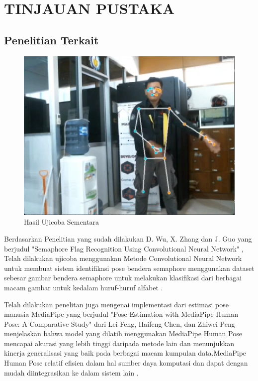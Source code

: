 \section{TINJAUAN PUSTAKA}


\subsection{Penelitian Terkait}
\begin{figure} [ht] \centering
    \includegraphics[scale=0.5]{gambar/contoh.png}
    \caption{Hasil Ujicoba Sementara}
    \label{fig:Ujicoba Sementara}
  \end{figure}

Berdasarkan Penelitian yang sudah dilakukan D. Wu, X. Zhang dan J. Guo yang berjudul "Semaphore Flag Recognition Using Convolutional Neural Network" , Telah dilakukan ujicoba menggunakan Metode Convolutional Neural Network untuk membuat sistem identifikasi pose bendera semaphore menggunakan dataset sebesar gambar bendera semaphore untuk melakukan klasifikasi dari berbagai macam gambar untuk kedalam huruf-huruf alfabet 
\parencite{SemaphoreFlagCNN}. 

Telah dilakukan penelitan juga mengenai implementasi dari estimasi pose manusia MediaPipe yang berjudul "Pose Estimation with MediaPipe Human Pose: A Comparative Study" dari Lei Feng, Haifeng Chen, dan Zhiwei Peng menjelaskan bahwa model yang dilatih menggunakan MediaPipe Human Pose mencapai akurasi yang lebih tinggi daripada metode lain dan menunjukkan kinerja generalisasi yang baik pada berbagai macam kumpulan data.MediaPipe Human Pose relatif efisien dalam hal sumber daya komputasi dan dapat dengan mudah diintegrasikan ke dalam sistem lain \parencite{MediaPipe}.

